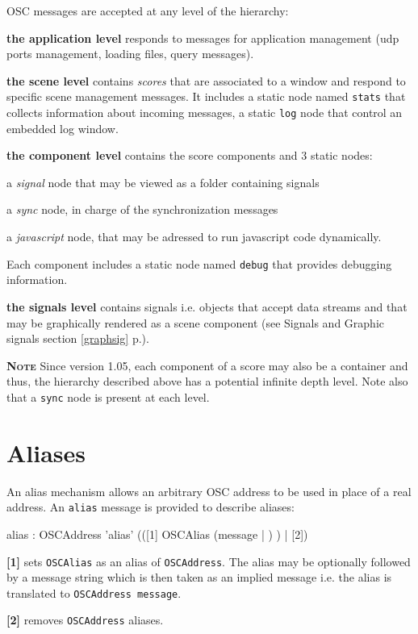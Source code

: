 \documentclass[a4paper,twoside]{report}
\newcommand{\sublevel}[1]	{\section{#1}}
\newcommand{\fullref}[1]	{\ref{#1} p.\pageref{#1}}
\newcommand{\OSC}[1]		{\texttt{#1}}
\newcommand{\note}	[1]		{\vspace{2mm}\textbf{\hspace{-1.03cm}\textbf{\textsc{Note #1}}}}
\let\olditemize\itemize
\let\oldenditemize\enditemize
\renewenvironment{itemize} 	{\olditemize \setlength{\itemsep}{1mm}}{\oldenditemize}
\begin{document}
OSC messages are accepted at any level of the hierarchy:
\begin{itemize}

\item \textbf{the application level} responds to messages for application management (udp ports management, loading files, query messages). \\

\item \textbf{the scene level} contains \emph{scores} that are associated to a window and respond to specific scene management messages. 
It includes a static node named \OSC{stats} that collects information about incoming messages, a static \OSC{log} node that control an embedded log window.


\item \textbf{the component level} contains the score components and 3 static nodes:
\begin{itemize}
\item a \emph{signal} node that may be viewed as a folder containing signals
\item a \emph{sync} node, in charge of the synchronization messages
\item a \emph{javascript} node, that may be adressed to run javascript code dynamically.
\end{itemize}

Each component includes a static node named \OSC{debug} that provides debugging information.
\item \textbf{the signals level} contains signals i.e. objects that accept data streams and that may be graphically rendered as a scene component (see Signals and Graphic signals section \fullref{graphsig}).

\end{itemize}

\note{} Since version 1.05, each component of a score may also be a container and thus, the hierarchy described above has a potential infinite depth level. Note also that a \OSC{sync} node is present at each level. 


\sublevel{Aliases}
\label{alias}
An alias mechanism allows an arbitrary OSC address to be used in place of a real address. An \OSC{alias} message is provided to describe aliases: 
\begin{rail}
alias : OSCAddress 'alias' (([1] OSCAlias (message | ) ) | [2])
\end{rail}
\begin{itemize}
\item \textbf{[1]} sets \OSC{OSCAlias} as an alias of \OSC{OSCAddress}. The alias may be optionally followed by a message string which is then taken as an implied message i.e. the alias is translated to \OSC{OSCAddress message}.
\item \textbf{[2]} removes \OSC{OSCAddress} aliases.
\end{itemize}
\end{document}
